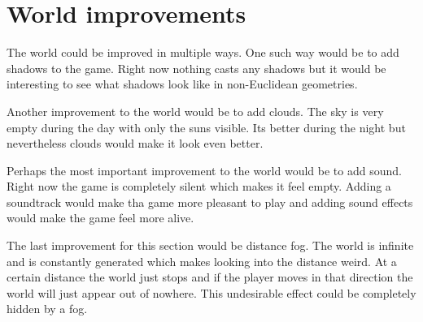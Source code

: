 \section{World improvements}
The world could be improved in multiple ways.
One such way would be to add shadows to the game.
Right now nothing casts any shadows but it would be interesting to see what shadows look like in non-Euclidean geometries.

Another improvement to the world would be to add clouds.
The sky is very empty during the day with only the suns visible.
Its better during the night but nevertheless clouds would make it look even better.

Perhaps the most important improvement to the world would be to add sound.
Right now the game is completely silent which makes it feel empty.
Adding a soundtrack would make tha game more pleasant to play and adding sound effects would make the game feel more alive.

The last improvement for this section would be distance fog.
The world is infinite and is constantly generated which makes looking into the distance weird.
At a certain distance the world just stops and if the player moves in that direction the world will just appear out of nowhere.
This undesirable effect could be completely hidden by a fog.